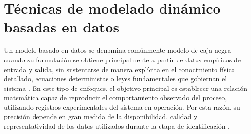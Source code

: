 \documentclass[11pt]{report}
\begin{document}

\section{Técnicas de modelado dinámico basadas en datos}

Un modelo basado en datos se denomina comúnmente modelo de caja negra cuando su formulación se obtiene principalmente a partir de datos empíricos de entrada y salida, sin sustentarse de manera explícita en el conocimiento físico detallado, ecuaciones deterministas o leyes fundamentales que gobiernan el sistema \cite{wallentinsson2020empirical}.
En este tipo de enfoques, el objetivo principal es establecer una relación matemática capaz de reproducir el comportamiento observado del proceso, utilizando registros experimentales del sistema en operación. Por esta razón, su precisión depende en gran medida de la disponibilidad, calidad y representatividad de los datos utilizados durante la etapa de identificación \cite{BALALI2023113496}. 
\end{document}
